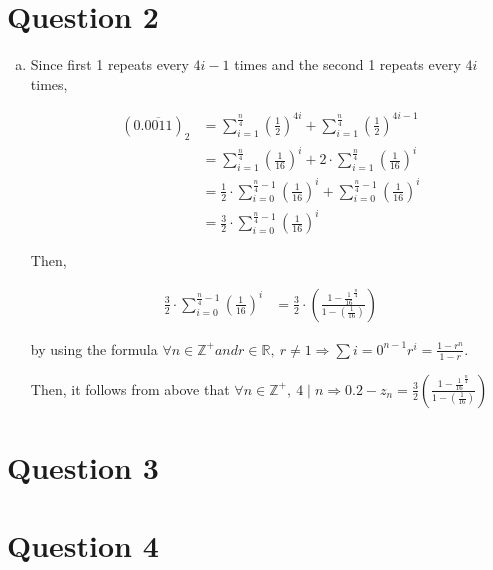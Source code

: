 \documentclass[12pt]{article}
\begin{document}
\section*{Question 2}
\begin{enumerate}[a.]
    \item

    Since first 1 repeats every $4i - 1$ times and the second 1 repeats every $4i$ times,

    \setcounter{equation}{0}
    \begin{align}
        (0.\overline{0011})_2 &= \sum\limits_{i=1}^{\frac{n}{4}} \left( \frac{1}{2} \right)^{4i} + \sum\limits_{i=1}^{\frac{n}{4}} \left( \frac{1}{2} \right)^{4i-1}\\
        &= \sum\limits_{i=1}^{\frac{n}{4}} \left( \frac{1}{16} \right)^{i} + 2 \cdot \sum\limits_{i=1}^{\frac{n}{4}} \left( \frac{1}{16} \right)^{i}\\
        &= \frac{1}{2} \cdot \sum\limits_{i=0}^{\frac{n}{4} - 1} \left( \frac{1}{16} \right)^{i} + \sum\limits_{i=0}^{\frac{n}{4}-1} \left( \frac{1}{16} \right)^{i}\\
        &= \frac{3}{2} \cdot \sum\limits_{i=0}^{\frac{n}{4} - 1} \left( \frac{1}{16} \right)^{i}
    \end{align}

    \bigskip

    Then,

    \begin{align}
        \frac{3}{2} \cdot \sum\limits_{i=0}^{\frac{n}{4} - 1} \left( \frac{1}{16} \right)^{i} &= \frac{3}{2} \cdot \left(\frac{1 - \frac{1}{16}^{\frac{n}{4}}}{1 - (\frac{1}{16})} \right)
    \end{align}

    by using the formula $\forall n \in \mathbb{Z}^{+} and r \in \mathbb{R},\: r \neq 1 \Rightarrow \sum\limits{i=0}^{n-1} r^i = \frac{1-r^n}{1 - r}$.

    \bigskip

    Then, it follows from above that $\forall n \in \mathbb{Z}^{+},\: 4 \mid n
    \Rightarrow 0.2 - z_n = \frac{3}{2} \left(\frac{1 - \frac{1}{16}^{\frac{n}{4}}}{1 -
    (\frac{1}{16})} \right)$

\end{enumerate}

\section*{Question 3}

\section*{Question 4}
\end{document}
